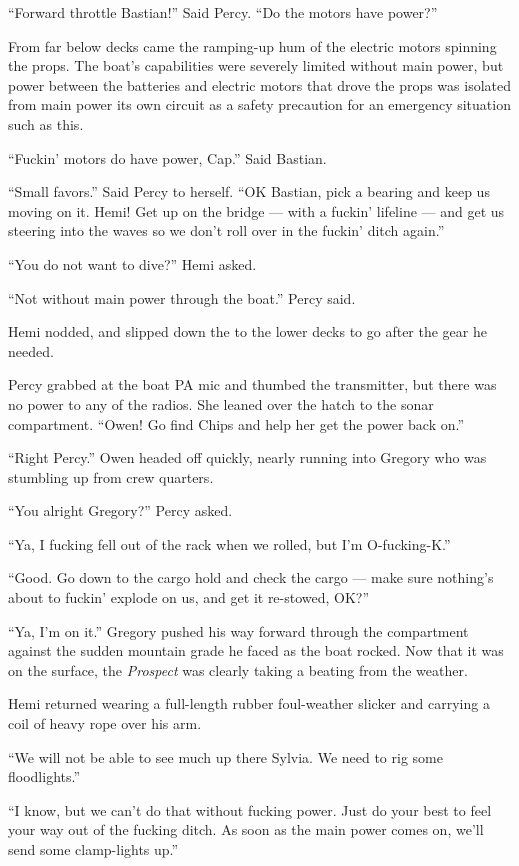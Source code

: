 \documentclass[
]{scrbook}
\begin{document}
``Forward throttle Bastian!'' Said Percy. ``Do the motors have power?''

From far below decks came the ramping-up hum of the electric motors
spinning the props. The boat's capabilities were severely limited
without main power, but power between the batteries and electric motors
that drove the props was isolated from main power its own circuit as a
safety precaution for an emergency situation such as this.

``Fuckin' motors do have power, Cap.'' Said Bastian.

``Small favors.'' Said Percy to herself. ``OK Bastian, pick a bearing
and keep us moving on it. Hemi! Get up on the bridge --- with a fuckin'
lifeline --- and get us steering into the waves so we don't roll over in
the fuckin' ditch again.''

``You do not want to dive?'' Hemi asked.

``Not without main power through the boat.'' Percy said.

Hemi nodded, and slipped down the to the lower decks to go after the
gear he needed.

Percy grabbed at the boat PA mic and thumbed the transmitter, but there
was no power to any of the radios. She leaned over the hatch to the
sonar compartment. ``Owen! Go find Chips and help her get the power back
on.''

``Right Percy.'' Owen headed off quickly, nearly running into Gregory
who was stumbling up from crew quarters.

``You alright Gregory?'' Percy asked.

``Ya, I fucking fell out of the rack when we rolled, but I'm
O-fucking-K.''

``Good. Go down to the cargo hold and check the cargo --- make sure
nothing's about to fuckin' explode on us, and get it re-stowed, OK?''

``Ya, I'm on it.'' Gregory pushed his way forward through the
compartment against the sudden mountain grade he faced as the boat
rocked. Now that it was on the surface, the \emph{Prospect} was clearly
taking a beating from the weather.

Hemi returned wearing a full-length rubber foul-weather slicker and
carrying a coil of heavy rope over his arm.

``We will not be able to see much up there Sylvia. We need to rig some
floodlights.''

``I know, but we can't do that without fucking power. Just do your best
to feel your way out of the fucking ditch. As soon as the main power
comes on, we'll send some clamp-lights up.''
\end{document}
